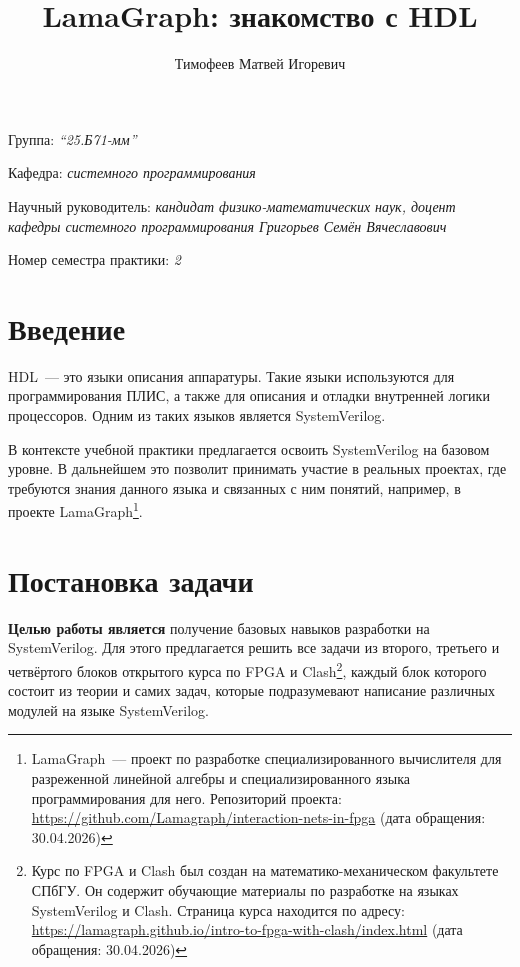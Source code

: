 \documentclass[a4paper]{article}
\title{LamaGraph: знакомство с HDL}
\author{Тимофеев Матвей Игоревич}
\date{}
\begin{document}
\maketitle

\begin{flushright}
    Группа: \emph{\enquote{25.Б71-мм}}

    Кафедра: \emph{системного программирования}

    Научный руководитель: \emph{кандидат физико-математических наук, доцент кафедры системного программирования Григорьев Семён Вячеславович}

    Номер семестра практики: \emph{2}
\end{flushright} 

\section{Введение}

HDL~--- это языки описания аппаратуры. Такие языки используются для программирования ПЛИС, а также для описания и отладки внутренней логики процессоров. Одним из таких языков является SystemVerilog.

В контексте учебной практики предлагается освоить SystemVerilog на базовом уровне. В дальнейшем это позволит принимать участие в реальных проектах, где требуются знания данного языка и связанных с ним понятий, например, в проекте LamaGraph\footnote{LamaGraph~--- проект по разработке специализированного вычислителя для разреженной линейной алгебры и специализированного языка программирования для него. Репозиторий проекта: \url{https://github.com/Lamagraph/interaction-nets-in-fpga} (дата обращения: 30.04.2026)}.

\section{Постановка задачи}

\textbf{Целью работы является} получение базовых навыков разработки на SystemVerilog. Для этого предлагается решить все задачи из второго, третьего и четвёртого блоков открытого курса по FPGA и Clash\footnote{Курс по FPGA и Clash был создан на математико-механическом факультете СПбГУ. Он содержит обучающие материалы по разработке на языках SystemVerilog и Clash. Страница курса находится по адресу: \url{https://lamagraph.github.io/intro-to-fpga-with-clash/index.html} (дата обращения: 30.04.2026)}, каждый блок которого состоит из теории и самих задач, которые подразумевают написание различных модулей на языке SystemVerilog.
\end{document}
